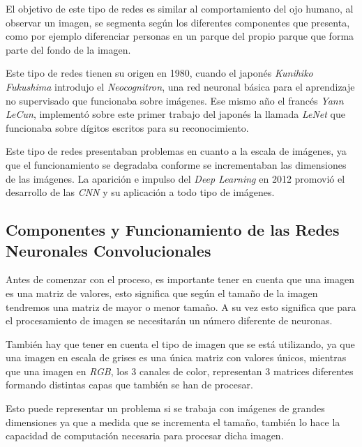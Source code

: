El objetivo de este tipo de redes es similar al comportamiento del ojo humano, al observar un imagen, se segmenta según los diferentes componentes que presenta, como por ejemplo diferenciar personas en un parque del propio parque que forma parte del fondo de la imagen.

Este tipo de redes tienen su origen en 1980, cuando el japonés \emph{Kunihiko Fukushima} \cite{wiki:Kunihiko_Fukushima} introdujo el \emph{Neocognitron}, una red neuronal básica para el aprendizaje no supervisado que funcionaba sobre imágenes. Ese mismo año el francés \emph{Yann LeCun}, implementó sobre este primer trabajo del japonés la llamada \emph{LeNet} que funcionaba sobre dígitos escritos para su reconocimiento.

Este tipo de redes presentaban problemas en cuanto a la escala de imágenes, ya que el funcionamiento se degradaba conforme se incrementaban las dimensiones de las imágenes. La aparición e impulso del \emph{Deep Learning} en 2012 promovió el desarrollo de las \emph{CNN} y su aplicación a todo tipo de imágenes.

\subsection{Componentes y Funcionamiento de las Redes Neuronales Convolucionales}

Antes de comenzar con el proceso, es importante tener en cuenta que una imagen es una matriz de valores, esto significa que según el tamaño de la imagen tendremos una matriz de mayor o menor tamaño. A su vez esto significa que para el procesamiento de imagen se necesitarán un número diferente de neuronas.

También hay que tener en cuenta el tipo de imagen que se está utilizando, ya que una imagen en escala de grises es una única matriz con valores únicos, mientras que una imagen en \emph{RGB}, los 3 canales de color, representan 3 matrices diferentes formando distintas capas que también se han de procesar.

Esto puede representar un problema si se trabaja con imágenes de grandes dimensiones ya que a medida que se incrementa el tamaño, también lo hace la capacidad de computación necesaria para procesar dicha imagen.

